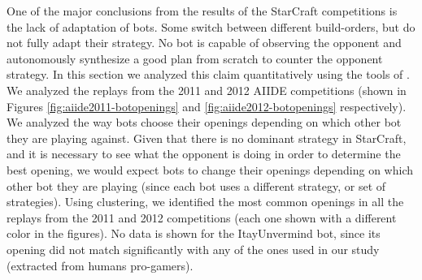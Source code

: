 \documentclass[journal]{IEEEtran}
\begin{document}
One of the major conclusions from the results of the StarCraft competitions is the lack of adaptation of bots.  Some switch between different build-orders, but do not fully adapt their strategy. No bot is capable of observing the opponent and autonomously synthesize a good plan from scratch to counter the opponent strategy. In this section we analyzed this claim quantitatively using the tools of \cite{SynnaeveOpeningCig11}. We analyzed the replays from the 2011 and 2012 AIIDE competitions (shown in Figures \ref{fig:aiide2011-botopenings} and \ref{fig:aiide2012-botopenings} respectively). We analyzed the way bots choose their openings depending on which other bot they are playing against. Given that there is no dominant strategy in StarCraft, and it is necessary to see what the opponent is doing in order to determine the best opening, we would expect bots to change their openings depending on which other bot they are playing (since each bot uses a different strategy, or set of strategies). Using clustering, we identified the most common openings in all the replays from the 2011 and 2012 competitions (each one shown with a different color in the figures). No data is shown for the ItayUnvermind bot, since its opening did not match significantly with any of the ones used in our study (extracted from humans pro-gamers).
\end{document}
